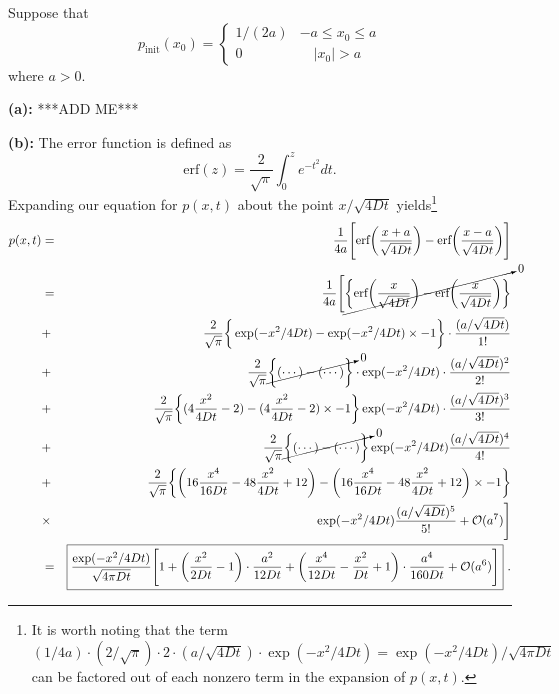 Suppose that
\begin{equation*}
p_\text{init}(x_0) =  \left\{
        \begin{array}{ll}
            1/(2a) & -a \leq x_0 \leq a \\
            0 & \quad |x_0|>a
        \end{array}
    \right.
\end{equation*}
where $a>0$.

\textbf{(a):} ***ADD ME***

\textbf{(b):} The error function is defined as
\begin{equation}
\text{erf}(z) = \frac{2}{\sqrt{\pi}} \int_{0}^{z} e^{-t^2} dt.
\end{equation}
Expanding our equation for $p(x, t)$ about the point $x/\sqrt{4Dt}$ yields\footnote{It is worth noting that the term $(1/4a) \cdot (2/\sqrt{\pi}) \cdot 2 \cdot (a/\sqrt{4 D t}) \cdot \exp(-x^2/4Dt) = \exp(-x^2/4Dt)/\sqrt{4 \pi D t} $ can be factored out of each nonzero term in the expansion of $p(x,t)$.}
\begin{eqnarray}
p(x, t) &=& \frac{1}{4a} \Bigg[ \text{erf}\bigg(\frac{x+a}{\sqrt{4 D t}}\bigg) - \text{erf}\bigg(\frac{x-a}{\sqrt{4 D t}}\bigg)\Bigg]  \nonumber \\
&=& \frac{1}{4a} \Bigg[ \cancelto{0}{\bigg\{ \text{erf}\bigg(\frac{x}{\sqrt{4 D t}}\bigg) - \text{erf}\bigg(\frac{x}{\sqrt{4 D t}}\bigg) \bigg\}}  \nonumber \\ 
&+& \frac{2}{\sqrt{\pi}} \bigg\{ \exp(-x^2/4Dt) -\exp(-x^2/4Dt)  \times -1 \bigg\} \cdot \frac{(a/\sqrt{4 D t})}{1!}  \nonumber \\
&+& \frac{2}{\sqrt{\pi}} \cancelto{0}{\bigg\{ (\cdots) - (\cdots) \bigg\}} \cdot \exp(-x^2/4Dt) \cdot \frac{(a/\sqrt{4 D t})^2}{2!}  \nonumber \\
&+& \frac{2}{\sqrt{\pi}} \bigg\{ (4 \frac{x^2}{4Dt}-2) - (4 \frac{x^2}{4Dt}-2) \times -1 \bigg\} \exp(-x^2/4Dt) \cdot \frac{(a/\sqrt{4 D t})^3}{3!}  \nonumber \\
&+& \frac{2}{\sqrt{\pi}} \cancelto{0}{\bigg\{ (\cdots) - (\cdots) \bigg\}} \exp(-x^2/4Dt) \frac{(a/\sqrt{4 D t})^4}{4!}  \nonumber \\
&+& \frac{2}{\sqrt{\pi}} \bigg\{ \bigg( 16 \frac{x^4}{16 D t} - 48 \frac{x^2}{4 D t} + 12\bigg) - \bigg( 16 \frac{x^4}{16 D t} - 48 \frac{x^2}{4 D t} + 12\bigg) \times -1 \bigg\} \nonumber \\
&\times& \exp(-x^2/4Dt) \frac{(a/\sqrt{4 D t})^5}{5!} + \mathcal{O}(a^7) \Bigg] \nonumber \\
&=& \boxed{\frac{\exp(-x^2/4Dt)}{\sqrt{4 \pi D t}} \Bigg[ 1 + \bigg(\frac{x^2}{2 D t} -1 \bigg) \cdot \frac{a^2}{12 D t} 
+ \bigg(\frac{x^4}{12 D t} -\frac{x^2}{D t} + 1 \bigg) \cdot \frac{a^4}{160 D t} + \mathcal{O}(a^6) \Bigg]}~. \nonumber
\end{eqnarray}